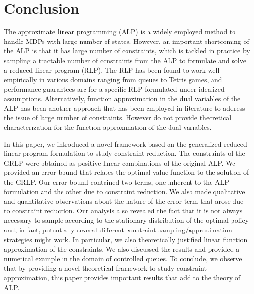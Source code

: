 \section{Conclusion}
The approximate linear programming (ALP) is a widely employed method to handle MDPs with large number of states. However, an important shortcoming of the ALP is that it has large number of constraints, which is tackled in practice by sampling a tractable number of constraints from the ALP to formulate and solve a reduced linear program (RLP). The RLP has been found to work well empirically in various domains ranging from queues to Tetris games, and performance guarantees are for a specific RLP formulated under idealized assumptions. Alternatively, function approximation in the dual variables of the ALP has been another approach that has been employed in literature \cite{ALP-Bor,dolgov} to address the issue of large number of constraints. However \cite{ALP-Bor,dolgov} do not provide theoretical characterization for the function approximation of the dual variables.\par
In this paper, we introduced a novel framework based on the generalized reduced linear program formulation to study constraint reduction. The constraints of the GRLP were obtained as positive linear combinations of the original ALP. We provided an error bound that relates the optimal value function to the solution of the GRLP. Our error bound contained two terms, one inherent to the ALP formulation and the other due to constraint reduction. We also made qualitative and quantitative observations about the nature of the error term that arose due to constraint reduction. Our analysis also revealed the fact that it is not always necessary to sample according to the stationary distribution of the optimal policy and, in fact, potentially several different constraint sampling/approximation strategies might work. In particular, we also theoretically justified linear function approximation of the constraints. We also discussed the results and provided a numerical example in the domain of controlled queues. To conclude, we observe that by providing a novel theoretical framework to study constraint approximation, this paper provides important results that add to the theory of ALP.


